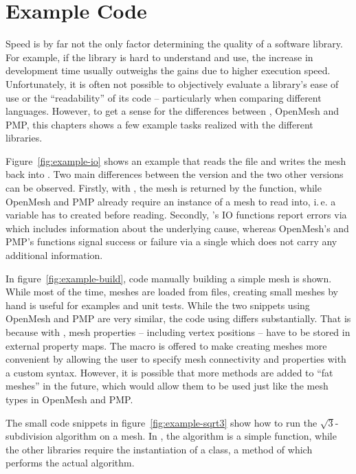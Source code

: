 \newpage
\section{Example Code}

Speed is by far not the only factor determining the quality of a software library.
For example, if the library is hard to understand and use, the increase in development time usually outweighs the gains due to higher execution speed.
Unfortunately, it is often not possible to objectively evaluate a library's ease of use or the \enquote{readability} of its code -- particularly when comparing different languages.
However, to get a sense for the differences between , OpenMesh and PMP, this chapters shows a few example tasks realized with the different libraries.

Figure~\ref{fig:example-io} shows an example that reads the file  and writes the mesh back into .
Two main differences between the  version and the two other versions can be observed.
Firstly, with , the mesh is returned by the  function, while OpenMesh and PMP already require an instance of a mesh to read into, i.\,e. a variable has to created before reading.
Secondly, 's IO functions report errors via  which includes information about the underlying cause, whereas OpenMesh's and PMP's functions signal success or failure via a single  which does not carry any additional information.

In figure~\ref{fig:example-build}, code manually building a simple mesh is shown.
While most of the time, meshes are loaded from files, creating small meshes by hand is useful for examples and unit tests.
While the two snippets using OpenMesh and PMP are very similar, the code using  differs substantially.
That is because with , mesh properties -- including vertex positions -- have to be stored in external property maps.
The  macro is offered to make creating meshes more convenient by allowing the user to specify mesh connectivity and properties with a custom syntax.
However, it is possible that more methods are added to \enquote{fat meshes} in the future, which would allow them to be used just like the mesh types in OpenMesh and PMP.

The small code snippets in figure~\ref{fig:example-sqrt3} show how to run the $\sqrt{3}$-subdivision algorithm \cite{kobbelt20003} on a mesh.
In , the algorithm is a simple function, while the other libraries require the instantiation of a class, a method of which performs the actual algorithm.

